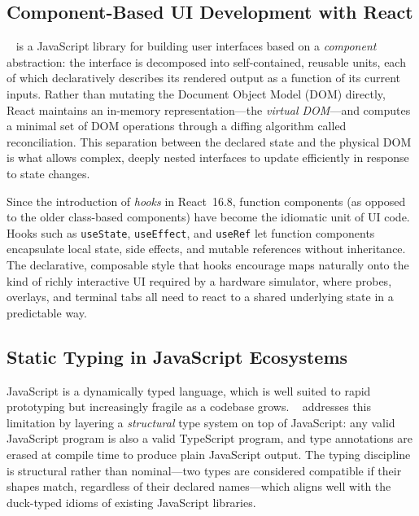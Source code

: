 \subsection{Component-Based UI Development with React}\label{subsec:react-components}

\reactjs{}~\cite{reactdocs} is a JavaScript library for building user interfaces based on a \emph{component} abstraction: the interface is decomposed into self-contained, reusable units, each of which declaratively describes its rendered output as a function of its current inputs. Rather than mutating the Document Object Model (DOM) directly, React maintains an in-memory representation---the \emph{virtual DOM}---and computes a minimal set of DOM operations through a diffing algorithm called reconciliation. This separation between the declared state and the physical DOM is what allows complex, deeply nested interfaces to update efficiently in response to state changes.

Since the introduction of \emph{hooks} in React~16.8, function components (as opposed to the older class-based components) have become the idiomatic unit of UI code. Hooks such as \texttt{useState}, \texttt{useEffect}, and \texttt{useRef} let function components encapsulate local state, side effects, and mutable references without inheritance. The declarative, composable style that hooks encourage maps naturally onto the kind of richly interactive UI required by a hardware simulator, where probes, overlays, and terminal tabs all need to react to a shared underlying state in a predictable way.

\subsection{Static Typing in JavaScript Ecosystems}\label{subsec:typescript-bg}

JavaScript is a dynamically typed language, which is well suited to rapid prototyping but increasingly fragile as a codebase grows. \typescript{}~\cite{typescripthandbook} addresses this limitation by layering a \emph{structural} type system on top of JavaScript: any valid JavaScript program is also a valid TypeScript program, and type annotations are erased at compile time to produce plain JavaScript output. The typing discipline is structural rather than nominal---two types are considered compatible if their shapes match, regardless of their declared names---which aligns well with the duck-typed idioms of existing JavaScript libraries.

